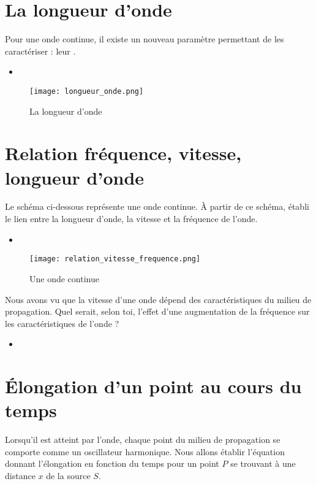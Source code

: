 \newpage

\section{La longueur d'onde}
Pour une onde continue, il existe un nouveau paramètre permettant de les caractériser : leur .
\begin{itemize}[label=\textbullet]
    \item {}
\end{itemize}

\begin{figure}[ht!]
    \centering
    \texttt{[image: longueur\_onde.png]}
    \caption{La longueur d'onde}
    \label{longueur_onde}
\end{figure}

\newpage

\section{Relation fréquence, vitesse, longueur d'onde}
Le schéma ci-dessous représente une onde continue. À partir de ce schéma, établi le lien entre la longueur d'onde, la vitesse et la fréquence de l'onde.
\begin{itemize}[label=\textbullet]
    \item
\end{itemize}
\begin{figure}[ht!]
    \centering
    \texttt{[image: relation\_vitesse\_frequence.png]}
    \caption{Une onde continue}
    \label{relation_vitesse_frequence}
\end{figure}

Nous avons vu que la vitesse d'une onde dépend des caractéristiques du milieu de propagation. Quel serait, selon toi, l'effet d'une augmentation de la fréquence sur les caractéristiques de l'onde ?

\begin{itemize}[label=\textbullet]
    \item
\end{itemize}

\section{Élongation d'un point au cours du temps}
Lorsqu'il est atteint par l'onde, chaque point du milieu de propagation se comporte comme un oscillateur harmonique. Nous allons établir l'équation donnant l'élongation en fonction du temps pour un point \(P\) se trouvant à une distance \(x\) de la source \(S\).

